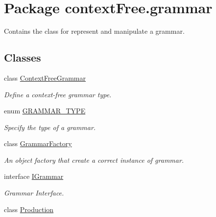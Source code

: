\hypertarget{namespacecontext_free_1_1grammar}{\section{Package context\-Free.\-grammar}
\label{namespacecontext_free_1_1grammar}
}


Contains the class for represent and manipulate a grammar.  


\subsection*{Classes}
\begin{DoxyCompactItemize}
\item 
class \hyperlink{classcontext_free_1_1grammar_1_1_context_free_grammar}{Context\-Free\-Grammar}
\begin{DoxyCompactList}\small\item\em Define a context-\/free grammar type. \end{DoxyCompactList}\item 
enum \hyperlink{enumcontext_free_1_1grammar_1_1_g_r_a_m_m_a_r___t_y_p_e}{G\-R\-A\-M\-M\-A\-R\-\_\-\-T\-Y\-P\-E}
\begin{DoxyCompactList}\small\item\em Specify the type of a grammar. \end{DoxyCompactList}\item 
class \hyperlink{classcontext_free_1_1grammar_1_1_grammar_factory}{Grammar\-Factory}
\begin{DoxyCompactList}\small\item\em An object factory that create a correct instance of grammar. \end{DoxyCompactList}\item 
interface \hyperlink{interfacecontext_free_1_1grammar_1_1_i_grammar}{I\-Grammar}
\begin{DoxyCompactList}\small\item\em Grammar Interface. \end{DoxyCompactList}\item 
class \hyperlink{classcontext_free_1_1grammar_1_1_production}{Production}
\end{DoxyCompactItemize}


